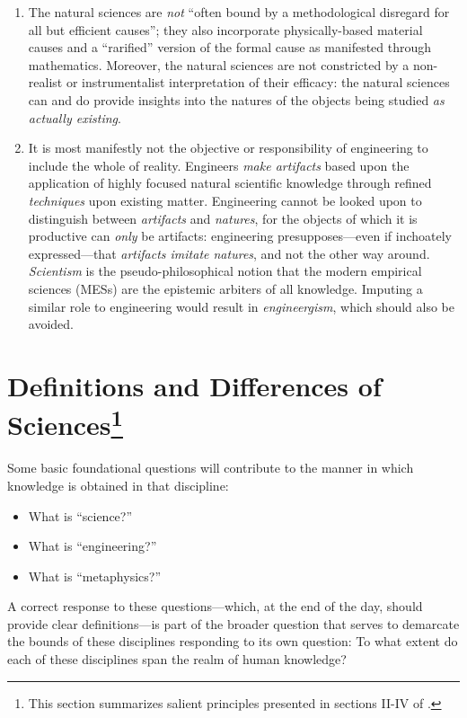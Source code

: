\begin{enumerate}
\item The natural sciences are \textit{not} ``often bound by a methodological disregard for all but efficient causes''; they also incorporate physically-based material causes and a ``rarified'' version of the formal cause as manifested through mathematics. Moreover, the natural sciences are not constricted by a non-realist or instrumentalist interpretation of their efficacy: the natural sciences can and do provide insights into the natures of the objects being studied \textit{as actually existing}.
\item It is most manifestly not the objective or responsibility of engineering to include the whole of reality. Engineers \textit{make artifacts} based upon the application of highly focused natural scientific knowledge through refined \textit{techniques} upon existing matter. Engineering cannot be looked upon to distinguish between \textit{artifacts} and \textit{natures}, for the objects of which it is productive can \textit{only} be artifacts: engineering presupposes---even if inchoately expressed---that \textit{artifacts imitate natures}, and not the other way around. \textit{Scientism} is the pseudo-philosophical notion that the modern empirical sciences (MESs) are the epistemic arbiters of all knowledge. Imputing a similar role to engineering would result in \textit{engineergism}, which should also be avoided.
\end{enumerate}

\section[Definitions and Differences of Sciences]{Definitions and Differences of Sciences\footnote{This section summarizes salient principles presented in sections II-IV of \citet[][pp.~23--167]{adler1978}.}}

Some basic foundational questions will contribute to the manner in which knowledge is obtained in that discipline:

\begin{itemize}
\item What is ``science?''
\item What is ``engineering?''
\item What is ``metaphysics?''
\end{itemize}

A correct response to these questions---which, at the end of the day, should provide clear definitions---is part of the broader question that serves to demarcate the bounds of these disciplines responding to its own question: To what extent do each of these disciplines span the realm of human knowledge?

